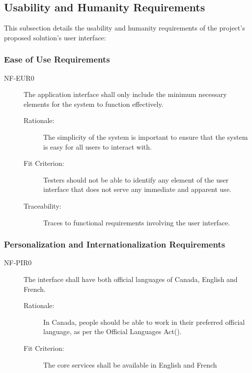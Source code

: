 \documentclass[12pt]{article}
\begin{document}
\subsection{Usability and Humanity Requirements}
This subsection details the usability and humanity requirements of the project's proposed solution's user interface:

\subsubsection{Ease of Use Requirements}
\begin{description}
    \item[NF-EUR0] The application interface shall only include the minimum necessary elements for the system to function effectively.
    \begin{description}
        \item[Rationale:] The simplicity of the system is important to ensure that the system is easy for all users to interact with.
        \item[Fit Criterion:] Testers should not be able to identify any element of the user interface that does not serve any immediate and apparent use.
        \item[Traceability:] Traces to functional requirements involving the user interface.
    \end{description}
\end{description}

\subsubsection{Personalization and Internationalization Requirements}
\begin{description}
    \item[NF-PIR0] The interface shall have both official languages of Canada, English and French.
    \begin{description}
        \item[Rationale:] In Canada, people should be able to work in their preferred official language, as per the Official Languages Act(\cite{OLA}).
        \item[Fit Criterion:] The core services shall be available in English and French
    \end{description}
\end{description}
\end{document}
